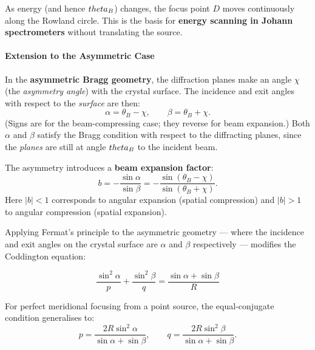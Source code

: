 As energy (and hence $\\theta_B$) changes, the focus point $D$ moves continuously along the
Rowland circle.  This is the basis for \textbf{energy scanning in Johann spectrometers}
without translating the source.


\paragraph{Extension to the Asymmetric Case}
In the \textbf{asymmetric Bragg geometry}, the diffraction planes make an angle $\chi$
(the \emph{asymmetry angle}) with the crystal surface.  The incidence and exit angles with
respect to the \emph{surface} are then:
\begin{equation}
  \alpha = \theta_B - \chi, \qquad \beta = \theta_B + \chi.
  \label{eq:asym_angles}
\end{equation}
(Signs are for the beam-compressing case; they reverse for beam expansion.)  Both $\alpha$
and $\beta$ satisfy the Bragg condition with respect to the diffracting planes, since the
\emph{planes} are still at angle $\\theta_B$ to the incident beam.

The asymmetry introduces a \textbf{beam expansion factor}:
\begin{equation}
  b = -\frac{\sin\alpha}{\sin\beta} = -\frac{\sin(\theta_B-\chi)}{\sin(\theta_B+\chi)}.
  \label{eq:asym_ratio}
\end{equation}
Here $|b|<1$ corresponds to angular expansion (spatial compression) and $|b|>1$ to angular
compression (spatial expansion).


Applying Fermat's principle to the asymmetric geometry --- where the incidence and exit
angles on the crystal surface are $\alpha$ and $\beta$ respectively --- modifies the
Coddington equation:

\begin{keyresult}
\begin{equation}
  \frac{\sin^2\alpha}{p} + \frac{\sin^2\beta}{q}
  = \frac{\sin\alpha + \sin\beta}{R}
  \label{eq:meridional_asym}
\end{equation}
\end{keyresult}

For perfect meridional focusing from a point source, the equal-conjugate condition
generalises to:
\begin{equation}
  p = \frac{2R\sin^2\alpha}{\sin\alpha+\sin\beta},
  \qquad
  q = \frac{2R\sin^2\beta}{\sin\alpha+\sin\beta}.
  \label{eq:asym_conjugates}
\end{equation}

